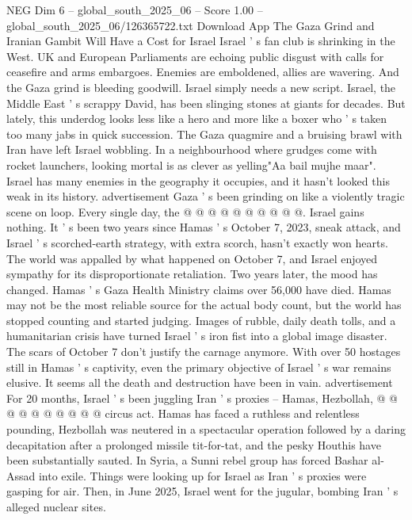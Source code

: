 \begin{textsample}{NEG Dim 6 – global\_south\_2025\_06 – Score 1.00 – global\_south\_2025\_06/126365722.txt}  \label{ex:f6_neg_431}
Download App The Gaza Grind and Iranian Gambit Will Have a Cost for Israel Israel ' s fan club is shrinking in the West.
UK and European Parliaments are echoing public disgust with calls for ceasefire and arms embargoes.
Enemies are emboldened, allies are wavering.
And the Gaza grind is bleeding goodwill.
Israel simply needs a new script.
Israel, the Middle East ' s scrappy David, has been slinging stones at giants for decades.
But lately, this underdog looks less like a hero and more like a boxer who ' s taken too many jabs in quick succession.
The Gaza quagmire and a bruising brawl with Iran have left Israel wobbling.
In a neighbourhood where grudges come with rocket launchers, looking mortal is as clever as yelling"Aa bail mujhe maar".
Israel has many enemies in the geography it occupies, and it hasn't looked this weak in its history. advertisement Gaza ' s been grinding on like a violently tragic scene on loop.
Every single day, the @ @ @ @ @ @ @ @ @ @.
Israel gains nothing.
It ' s been two years since Hamas ' s October 7, 2023, sneak attack, and Israel ' s scorched-earth strategy, with extra scorch, hasn't exactly won hearts.
The world was appalled by what happened on October 7, and Israel enjoyed sympathy for its disproportionate retaliation.
Two years later, the mood has changed.
Hamas ' s Gaza Health Ministry claims over 56,000 have died.
Hamas may not be the most reliable source for the actual body count, but the world has stopped counting and started judging.
Images of rubble, daily death tolls, and a humanitarian crisis have turned Israel ' s iron fist into a global image disaster.
The scars of October 7 don't justify the carnage anymore.
With over 50 hostages still in Hamas ' s captivity, even the primary objective of Israel ' s war remains elusive.
It seems all the death and destruction have been in vain. advertisement For 20 months, Israel ' s been juggling Iran ' s proxies -- Hamas, Hezbollah, @ @ @ @ @ @ @ @ @ @ circus act.
Hamas has faced a ruthless and relentless pounding, Hezbollah was neutered in a spectacular operation followed by a daring decapitation after a prolonged missile tit-for-tat, and the pesky Houthis have been substantially sauted.
In Syria, a Sunni rebel group has forced Bashar al-Assad into exile.
Things were looking up for Israel as Iran ' s proxies were gasping for air.
Then, in June 2025, Israel went for the jugular, bombing Iran ' s alleged nuclear sites.

\end{textsample}
